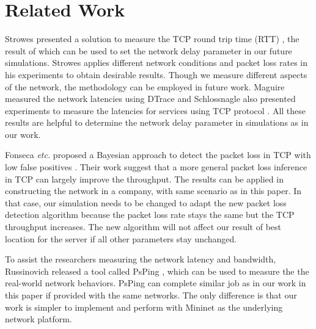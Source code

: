 \section{Related Work} \label{sec:related}

Strowes presented a solution to measure the TCP round trip time (RTT) \cite{Strowes:2013},
the result of which can be used to set the network delay parameter in our future simulations. 
Strowes applies different network conditions and packet loss rates in his experiments to 
obtain desirable results. Though we measure different aspects of the network, the methodology
can be employed in future work. Maguire measured the network latencies using DTrace \cite{Maguire:2010}
and Schlossnagle also presented experiments to measure the latencies
for services using TCP protocol \cite{Schlossnagle:2013}. 
All these results are helpful to determine the network delay parameter in simulations 
as in our work.

Fonseca {\it etc.} proposed a Bayesian approach to detect the packet loss in
TCP with low false positives \cite{FonsecaCrovella:Infocom05}. Their work suggest
that a more general packet loss inference in TCP can largely improve the throughput.
The results can be applied in constructing the network in a company, with same 
scenario as in this paper. In that case, our simulation needs to be changed
to adapt the new packet loss detection algorithm because the packet loss rate 
stays the same but the TCP throughput increases. The new algorithm will not 
affect our result of best location for the server if all other parameters 
stay unchanged. 

To assist the researchers
measuring the network latency and bandwidth, Russinovich released a tool called PsPing
\cite{PsPing:tool}, which can be used to measure the the real-world network behaviors. 
PsPing can complete similar job as in our work in this paper if provided with the same  
networks. The only difference is that our work is simpler to implement and 
perform with Mininet as the underlying network platform. 